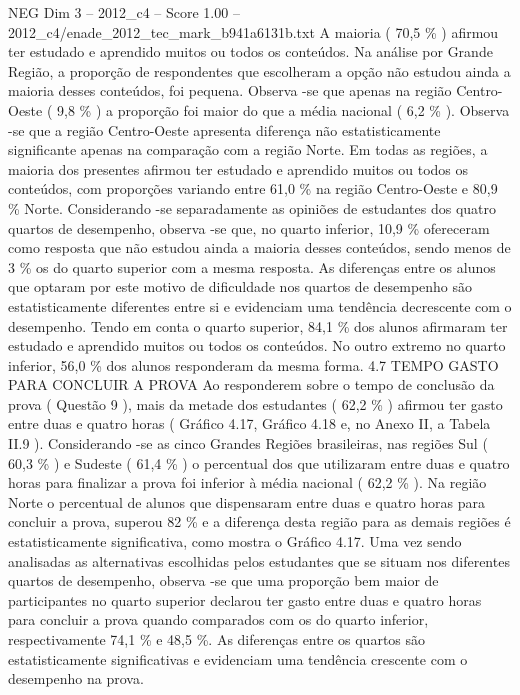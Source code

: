 \begin{textsample}{NEG Dim 3 – 2012\_c4 – Score 1.00 – 2012\_c4/enade\_2012\_tec\_mark\_b941a6131b.txt}
A maioria ( 70,5 \% ) afirmou ter estudado e aprendido muitos ou todos os conteúdos.
Na análise por Grande Região, a proporção de respondentes que escolheram a opção não estudou ainda a maioria desses conteúdos, foi pequena.
Observa -se que apenas na região Centro-Oeste ( 9,8 \% ) a proporção foi maior do que a média nacional ( 6,2 \% ).
Observa -se que a região Centro-Oeste apresenta diferença não estatisticamente significante apenas na comparação com a região Norte.
Em todas as regiões, a maioria dos presentes afirmou ter estudado e aprendido muitos ou todos os conteúdos, com proporções variando entre 61,0 \% na região Centro-Oeste e 80,9 \% Norte.
Considerando -se separadamente as opiniões de estudantes dos quatro quartos de desempenho, observa -se que, no quarto inferior, 10,9 \% ofereceram como resposta que não estudou ainda a maioria desses conteúdos, sendo menos de 3 \% os do quarto superior com a mesma resposta.
As diferenças entre os alunos que optaram por este motivo de dificuldade nos quartos de desempenho são estatisticamente diferentes entre si e evidenciam uma tendência decrescente com o desempenho.
Tendo em conta o quarto superior, 84,1 \% dos alunos afirmaram ter estudado e aprendido muitos ou todos os conteúdos.
No outro extremo no quarto inferior, 56,0 \% dos alunos responderam da mesma forma. 4.7 TEMPO GASTO PARA CONCLUIR A PROVA Ao responderem sobre o tempo de conclusão da prova ( Questão 9 ), mais da metade dos estudantes ( 62,2 \% ) afirmou ter gasto entre duas e quatro horas ( Gráfico 4.17, Gráfico 4.18 e, no Anexo II, a Tabela II.9 ).
Considerando -se as cinco Grandes Regiões brasileiras, nas regiões Sul ( 60,3 \% ) e Sudeste ( 61,4 \% ) o percentual dos que utilizaram entre duas e quatro horas para finalizar a prova foi inferior à média nacional ( 62,2 \% ).
Na região Norte o percentual de alunos que dispensaram entre duas e quatro horas para concluir a prova, superou 82 \% e a diferença desta região para as demais regiões é estatisticamente significativa, como mostra o Gráfico 4.17.
Uma vez sendo analisadas as alternativas escolhidas pelos estudantes que se situam nos diferentes quartos de desempenho, observa -se que uma proporção bem maior de participantes no quarto superior declarou ter gasto entre duas e quatro horas para concluir a prova quando comparados com os do quarto inferior, respectivamente 74,1 \% e 48,5 \%.
As diferenças entre os quartos são estatisticamente significativas e evidenciam uma tendência crescente com o desempenho na prova.

\end{textsample}
